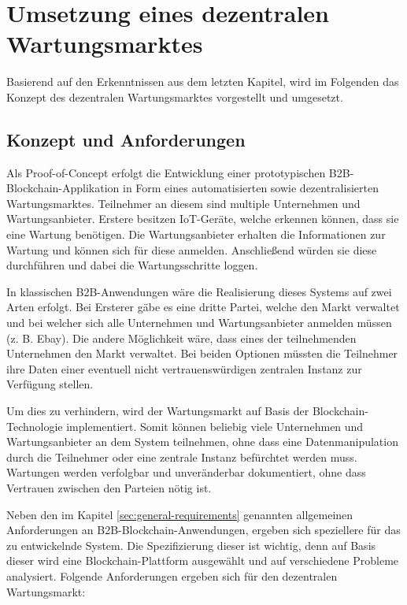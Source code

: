 \chapter{Umsetzung eines dezentralen Wartungsmarktes}
\label{cha:wartungsmarkt-impl}

Basierend auf den Erkenntnissen aus dem letzten Kapitel, wird im Folgenden das Konzept des dezentralen Wartungsmarktes vorgestellt und umgesetzt.

\section{Konzept und Anforderungen}
Als Proof-of-Concept erfolgt die Entwicklung einer prototypischen B2B-Blockchain-Applikation in Form eines automatisierten sowie dezentralisierten Wartungsmarktes. Teilnehmer an diesem sind multiple Unternehmen und Wartungsanbieter. Erstere besitzen IoT-Geräte, welche erkennen können, dass sie eine Wartung benötigen. Die Wartungsanbieter erhalten die Informationen zur Wartung und können sich für diese anmelden. Anschließend würden sie diese durchführen und dabei die Wartungsschritte loggen.  

In klassischen B2B-Anwendungen wäre die Realisierung dieses Systems auf zwei Arten erfolgt. Bei Ersterer gäbe es eine dritte Partei, welche den Markt verwaltet und bei welcher sich alle Unternehmen und Wartungsanbieter anmelden müssen (z. B. Ebay). Die andere Möglichkeit wäre, dass eines der teilnehmenden Unternehmen den Markt verwaltet. Bei beiden Optionen müssten die Teilnehmer ihre Daten einer eventuell nicht vertrauenswürdigen zentralen Instanz zur Verfügung stellen.

Um dies zu verhindern, wird der Wartungsmarkt auf Basis der Blockchain-Technologie implementiert. Somit können beliebig viele Unternehmen und Wartungsanbieter an dem System teilnehmen, ohne dass eine Datenmanipulation durch die Teilnehmer oder eine zentrale Instanz befürchtet werden muss. Wartungen werden verfolgbar und unveränderbar dokumentiert, ohne dass Vertrauen zwischen den Parteien nötig ist.

Neben den im Kapitel \ref{sec:general-requirements} genannten allgemeinen Anforderungen an B2B-Blockchain-Anwendungen, ergeben sich speziellere für das zu entwickelnde System. Die Spezifizierung dieser ist wichtig, denn auf Basis dieser wird eine Blockchain-Plattform ausgewählt und auf verschiedene Probleme analysiert. Folgende Anforderungen ergeben sich für den dezentralen Wartungsmarkt:


